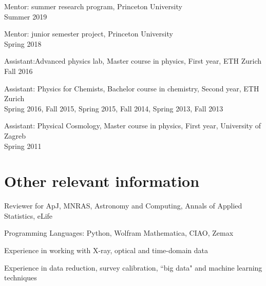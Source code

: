 \documentclass[11pt,letterpaper]{article}
\renewenvironment{itemize}{
  \begin{list}{}{
    \setlength{\leftmargin}{1.5em}
    \setlength{\itemsep}{0.10em}
    \setlength{\parskip}{0pt}
    \setlength{\parsep}{0.10em}
  }
}{
  \end{list}
}
\begin{document}
\begin{itemize}
\item Mentor: summer research program, Princeton University \\ Summer 2019
\item Mentor: junior semester project, Princeton University \\ Spring 2018
\item Assistant:Advanced physics lab, Master course in physics, First year, ETH Zurich \\ Fall 2016
\item Assistant: Physics for Chemists, Bachelor course in chemistry, Second year, ETH Zurich \\ Spring 2016, Fall 2015, Spring 2015, Fall 2014, Spring 2013, Fall 2013
\item Assistant: Physical Cosmology, Master course in physics, First year, University of Zagreb \\ Spring 2011 
\end{itemize}

\section*{Other relevant information}

\begin{itemize}
\item Reviewer for ApJ, MNRAS, Astronomy and Computing, Annals of Applied Statistics, eLife 
\item Programming Languages: Python, Wolfram Mathematica, CIAO, Zemax
\item Experience in working with X-ray, optical and time-domain data
 \item Experience in data reduction, survey calibration, ``big data" and machine learning techniques
\end{itemize}
\end{document}

